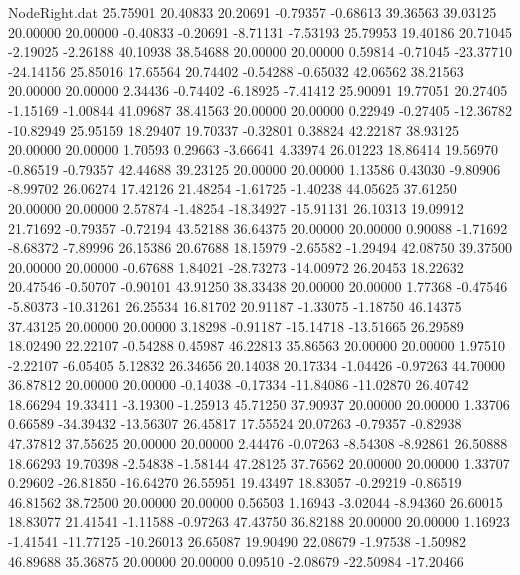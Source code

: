 \begin{filecontents}{NodeRight.dat}
  25.75901   20.40833   20.20691    -0.79357   -0.68613   39.36563   39.03125   20.00000   20.00000   -0.40833   -0.20691   -8.71131   -7.53193
  25.79953   19.40186   20.71045    -2.19025   -2.26188   40.10938   38.54688   20.00000   20.00000    0.59814   -0.71045  -23.37710  -24.14156
  25.85016   17.65564   20.74402    -0.54288   -0.65032   42.06562   38.21563   20.00000   20.00000    2.34436   -0.74402   -6.18925   -7.41412
  25.90091   19.77051   20.27405    -1.15169   -1.00844   41.09687   38.41563   20.00000   20.00000    0.22949   -0.27405  -12.36782  -10.82949
  25.95159   18.29407   19.70337    -0.32801    0.38824   42.22187   38.93125   20.00000   20.00000    1.70593    0.29663   -3.66641    4.33974
  26.01223   18.86414   19.56970    -0.86519   -0.79357   42.44688   39.23125   20.00000   20.00000    1.13586    0.43030   -9.80906   -8.99702
  26.06274   17.42126   21.48254    -1.61725   -1.40238   44.05625   37.61250   20.00000   20.00000    2.57874   -1.48254  -18.34927  -15.91131
  26.10313   19.09912   21.71692    -0.79357   -0.72194   43.52188   36.64375   20.00000   20.00000    0.90088   -1.71692   -8.68372   -7.89996
  26.15386   20.67688   18.15979    -2.65582   -1.29494   42.08750   39.37500   20.00000   20.00000   -0.67688    1.84021  -28.73273  -14.00972
  26.20453   18.22632   20.47546    -0.50707   -0.90101   43.91250   38.33438   20.00000   20.00000    1.77368   -0.47546   -5.80373  -10.31261
  26.25534   16.81702   20.91187    -1.33075   -1.18750   46.14375   37.43125   20.00000   20.00000    3.18298   -0.91187  -15.14718  -13.51665
  26.29589   18.02490   22.22107    -0.54288    0.45987   46.22813   35.86563   20.00000   20.00000    1.97510   -2.22107   -6.05405    5.12832
  26.34656   20.14038   20.17334    -1.04426   -0.97263   44.70000   36.87812   20.00000   20.00000   -0.14038   -0.17334  -11.84086  -11.02870
  26.40742   18.66294   19.33411    -3.19300   -1.25913   45.71250   37.90937   20.00000   20.00000    1.33706    0.66589  -34.39432  -13.56307
  26.45817   17.55524   20.07263    -0.79357   -0.82938   47.37812   37.55625   20.00000   20.00000    2.44476   -0.07263   -8.54308   -8.92861
  26.50888   18.66293   19.70398    -2.54838   -1.58144   47.28125   37.76562   20.00000   20.00000    1.33707    0.29602  -26.81850  -16.64270
  26.55951   19.43497   18.83057    -0.29219   -0.86519   46.81562   38.72500   20.00000   20.00000    0.56503    1.16943   -3.02044   -8.94360
  26.60015   18.83077   21.41541    -1.11588   -0.97263   47.43750   36.82188   20.00000   20.00000    1.16923   -1.41541  -11.77125  -10.26013
  26.65087   19.90490   22.08679    -1.97538   -1.50982   46.89688   35.36875   20.00000   20.00000    0.09510   -2.08679  -22.50984  -17.20466

\end{filecontents}
